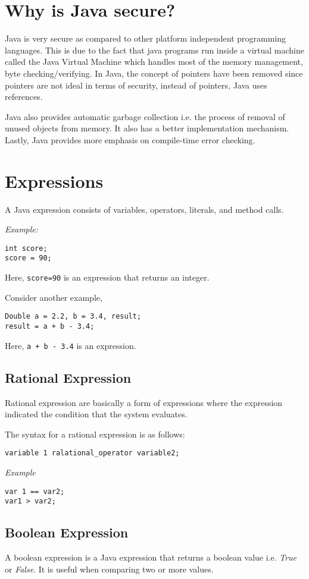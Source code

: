 \documentclass[a4paper, 12pt]{scrarticle}
\begin{document}
\section{Why is Java secure?}
Java is very secure as compared to other platform independent programming languages. This is due to the fact that java programs run inside a virtual machine called the Java Virtual Machine which handles most of the memory management, byte checking/verifying. In Java, the concept of pointers have been removed since pointers are not ideal in terms of security, instead of pointers, Java uses references.

Java also provides automatic garbage collection i.e. the process of removal of unused objects from memory. It also has a better implementation mechanism. Lastly, Java provides more emphasis on compile-time error checking.

\section{Expressions}
A Java expression consists of variables, operators, literals, and method calls.

\emph{Example:}
\begin{verbatim}
int score;
score = 90;
\end{verbatim}
Here, \verb+score=90+ is an expression that returns an integer.

Consider another example,
\begin{verbatim}
Double a = 2.2, b = 3.4, result;
result = a + b - 3.4;
\end{verbatim}
Here, \verb|a + b - 3.4| is an expression.

\subsection{Rational Expression}
Rational expression are basically a form of expressions where the expression indicated the condition that the system evaluates.

The syntax for a rational expression is as follows:

\begin{verbatim}
variable 1 ralational_operator variable2;
\end{verbatim}
\emph{Example}
\begin{verbatim}
var 1 == var2;
var1 > var2;
\end{verbatim}

\subsection{Boolean Expression}
A boolean expression is a Java expression that returns a boolean value i.e. \emph{True} or \emph{False}. It is useful when comparing two or more values.
\end{document}
